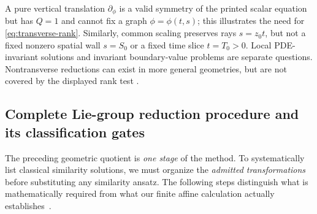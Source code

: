 \documentclass[12pt,a4paper,oneside]{report}
\numberwithin{equation}{chapter}
\theoremstyle{remark}\newtheorem{remark}[theorem]{Remark}
\begin{document}
A pure vertical translation $\partial_\phi$ is a valid symmetry of the
printed scalar equation but has $Q=1$ and cannot fix a graph
$\phi=\phi(t,s)$; this illustrates the need for
\eqref{eq:transverse-rank}. Similarly, common scaling preserves rays
$s=z_0t$, but not a fixed nonzero spatial wall $s=S_0$ or a fixed time slice
$t=T_0>0$. Local PDE-invariant solutions and invariant boundary-value
problems are separate questions. Nontransverse reductions can exist in more
general geometries, but are not covered by the displayed rank test
\cite{anderson2000}.


\subsection{Complete Lie-group reduction procedure and its classification gates}
The preceding geometric quotient is \emph{one stage} of the method. To
systematically list classical similarity solutions, we must organize the
\emph{admitted transformations} before substituting any similarity ansatz.
The following steps distinguish what is mathematically required from what
our finite affine calculation actually establishes~\cite[Ch.~3]{olver}.
\end{document}
